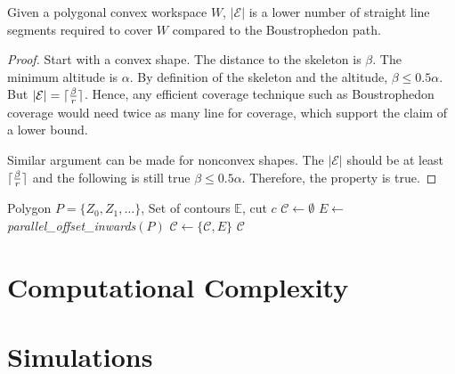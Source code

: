 \documentclass[../main.tex]{subfiles}
\begin{document}

\begin{proposition}
	Given a polygonal convex workspace $W$, $|\mathcal{E}|$ is a lower number of straight line segments required to cover $W$ compared to the Boustrophedon path.
\end{proposition}
\begin{proof}

Start with a convex shape. The distance to the skeleton is $\beta$. The minimum altitude is $\alpha$. By definition of the skeleton and the altitude, $\beta\leq 0.5\alpha$. But $|\mathcal{E}|=\lceil\frac{\beta}{r}\rceil$. Hence, any efficient coverage technique such as Boustrophedon coverage would need twice as many line for coverage, which support the claim of a lower bound.

Similar argument can be made for nonconvex shapes. The $|\mathcal{E}|$ should be at least $\lceil\frac{\beta}{r}\rceil$ and the following is still true $\beta\leq 0.5\alpha$. Therefore, the property is true.
\end{proof}

\begin{algorithm}
	\small
	\caption{$\operatorname{recalc\_encirclements}$}
	\label{alg:update_contours}
	\begin{algorithmic}[1]
		\REQUIRE Polygon $P=\{Z_0,Z_1,\ldots\}$, Set of contours $\mathbb{E}$, cut $c$
		\STATE $\mathcal{C}\gets\emptyset$ 
		\REPEAT
			\STATE $E\gets$ \textit{parallel\_offset\_inwards}$(P)$
			\STATE $\mathcal{C}\gets\{\mathcal{C},E\}$
		\RETURN $\mathcal{C}$
	\end{algorithmic}
\end{algorithm}


\section{Computational Complexity}

\section{Simulations}
\end{document}
